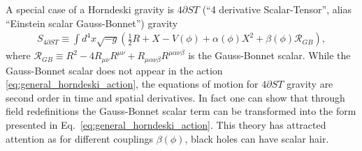 \documentclass{ws-ijmpd}
\begin{document}
A special case of a Horndeski gravity is $4\partial ST$ 
(``4 derivative Scalar-Tensor'', alias
``Einstein scalar Gauss-Bonnet'') gravity
\begin{align}
   \label{eq:action_4dST_gravity}
   S_{4\partial ST}
   \equiv
   \int d^4x\sqrt{-g}\left(
      \frac{1}{2}R 
      + 
      X
      -
      V\left(\phi\right)
      +
      \alpha\left(\phi\right)X^2
      +
      \beta\left(\phi\right)\mathcal{R}_{GB}
   \right)
   ,
\end{align}
where 
$\mathcal{R}_{GB}
\equiv 
R^2 
- 
4R_{\mu\nu}R^{\mu\nu} 
+ 
R_{\mu\alpha\nu\beta}R^{\mu\alpha\nu\beta}$
is the Gauss-Bonnet scalar. While the Gauss-Bonnet scalar does
not appear in the action \eqref{eq:general_horndeski_action},
the equations of motion for $4\partial ST$ gravity are second order
in time and 
spatial derivatives\cite{Zwiebach:1985uq,Gross:1986mw,
Kovacs:2020pns,Kovacs:2020ywu}.
In fact one can show that through field redefinitions the Gauss-Bonnet
scalar term can be transformed into the 
form presented in 
Eq.~\eqref{eq:general_horndeski_action}\cite{Kobayashi:2011nu}.
This theory has attracted attention as for different couplings
$\beta\left(\phi\right)$, black holes can have 
scalar hair\cite{Kanti:1995vq,
Sotiriou:2013qea,
Sotiriou:2014pfa,
Sotiriou:2015pka,
Silva:2017uqg,
Doneva:2017bvd,
Minamitsuji:2018xde
}.
\end{document}
